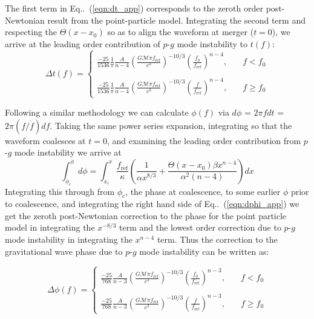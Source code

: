 The first term in Eq..~(\ref{eqn:dt_app}) corresponds to the zeroth order post-Newtonian result from the point-particle model. Integrating the second term and respecting the $\Theta(x-x_0)$ so as to align the waveform at merger ($t=0$), we arrive at the leading order contribution of $p$-$g$ mode instability to $t(f)$:
\begin{equation}\label{eqn:t_of_f_app}
\Delta t(f) = \left \{
              \begin{array}{ll}
              \frac{-25}{1536} \frac{1}{\pi} \frac{A}{n-4} \left ( \frac{G \mathcal{M} \pi f_{\mathrm{ref}}}{c^3} \right )^{-10/3}\left ( \frac{f_0}{f_{\mathrm{ref}}} \right )^{n-4}, &\quad   f < f_0 \\ \\
              \frac{-25}{1536} \frac{1}{\pi} \frac{A}{n-4} \left ( \frac{G \mathcal{M} \pi f_{\mathrm{ref}}}{c^3} \right )^{-10/3}\left ( \frac{f}{f_{\mathrm{ref}}} \right )^{n-4}, &\quad  f \ge f_0
              \end{array}
              \right.
\end{equation}

Following a similar methodology we can calculate $\phi(f)$ via $d\phi$ = $2 \pi f dt$ = $2 \pi (f/\dot{f}) df$. Taking the same power series expansion, integrating so that the waveform coalesces at $t = 0$, and examining the leading order contribution from $p$-$g$ mode instability we arrive at
\begin{equation}\label{eqn:dphi_app}
\int_{\phi_c}^\phi d\phi = \int_{x_c}^{x} \frac{f_{\mathrm{ref}}}{\kappa} \left (\frac{1}{\alpha x^{8/3}} +  \frac{\Theta(x - x_0) \beta x^{n-4}}{\alpha^2 (n-4)} \right ) dx
\end{equation}
Integrating this through from $\phi_c$, the phase at coalescence, to some earlier $\phi$ prior to coalescence, and integrating the right hand side of Eq..~(\ref{eqn:dphi_app}) we get the zeroth post-Newtonian correction to the phase for the point particle model in integrating the $x^{-8/3}$ term and the lowest order correction due to $p$-$g$ mode instability in integrating the $x^{n-4}$ term. Thus the correction to the gravitational wave phase due to $p$-$g$ mode instability can be written as:

\begin{equation}\label{eqn:delta_phi_app}
\Delta \phi(f) = \left \{
                     \begin{array}{ll}
                     \frac{-25}{768} \frac{A}{n-3} \left ( \frac{G \mathcal{M} \pi f_{\mathrm{ref}}}{c^3} \right )^{-10/3} \left ( \frac{f_0}{f_{\mathrm{ref}}} \right )^{n-3}, &\quad  f < f_0 \\ \\
                     \frac{-25}{768} \frac{A}{n-3} \left ( \frac{G \mathcal{M} \pi f_{\mathrm{ref}}}{c^3} \right )^{-10/3} \left ( \frac{f}{f_{\mathrm{ref}}} \right )^{n-3}, &\quad  f \ge f_0
                     \end{array}
                     \right.
\end{equation}

